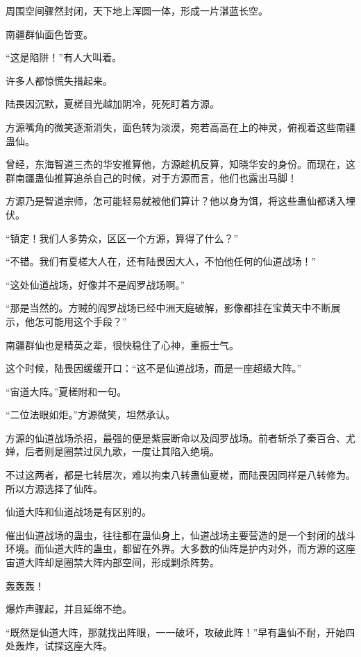 
\begin{this_body}



周围空间骤然封闭，天下地上浑圆一体，形成一片湛蓝长空。

南疆群仙面色皆变。

“这是陷阱！”有人大叫着。

许多人都惊慌失措起来。

陆畏因沉默，夏槎目光越加阴冷，死死盯着方源。

方源嘴角的微笑逐渐消失，面色转为淡漠，宛若高高在上的神灵，俯视着这些南疆蛊仙。

曾经，东海智道三杰的华安推算他，方源趁机反算，知晓华安的身份。而现在，这群南疆蛊仙推算追杀自己的时候，对于方源而言，他们也露出马脚！

方源乃是智道宗师，怎可能轻易就被他们算计？他以身为饵，将这些蛊仙都诱入埋伏。

“镇定！我们人多势众，区区一个方源，算得了什么？”

“不错。我们有夏槎大人在，还有陆畏因大人，不怕他任何的仙道战场！”

“这处仙道战场，好像并不是阎罗战场啊。”

“那是当然的。方贼的阎罗战场已经中洲天庭破解，影像都挂在宝黄天中不断展示，他怎可能用这个手段？”

南疆群仙也是精英之辈，很快稳住了心神，重振士气。

这个时候，陆畏因缓缓开口：“这不是仙道战场，而是一座超级大阵。”

“宙道大阵。”夏槎附和一句。

“二位法眼如炬。”方源微笑，坦然承认。

方源的仙道战场杀招，最强的便是紫宸断命以及阎罗战场。前者斩杀了秦百合、尤婵，后者则是圈禁过凤九歌，一度让其陷入绝境。

不过这两者，都是七转层次，难以拘束八转蛊仙夏槎，而陆畏因同样是八转修为。所以方源选择了仙阵。

仙道大阵和仙道战场是有区别的。

催出仙道战场的蛊虫，往往都在蛊仙身上，仙道战场主要营造的是一个封闭的战斗环境。而仙道大阵的蛊虫，都留在外界。大多数的仙阵是护内对外，而方源的这座宙道大阵却是圈禁大阵内部空间，形成剿杀阵势。

轰轰轰！

爆炸声骤起，并且延绵不绝。

“既然是仙道大阵，那就找出阵眼，一一破坏，攻破此阵！”早有蛊仙不耐，开始四处轰炸，试探这座大阵。


\end{this_body}
